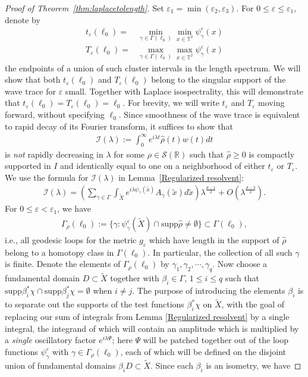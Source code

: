 \documentclass[11pt,letterpaper,oneside]{amsart}
\newcommand{\R}{\mathbb{R}}
\newcommand{\T}{\mathbb{T}}
\newcommand{\supp}{\text{supp}}
\theoremstyle{definition}
\theoremstyle{remark}
\newcommand{\eps}{\varepsilon}
\newcommand{\wt}{\widetilde}
\newcommand{\wh}{\widehat}
\newcommand{\I}{\mathcal{I}}
\theoremstyle{definition}
\theoremstyle{remark}
\begin{document}
\begin{proof}[Proof of Theorem~\ref{thm:laplacetolength}]
    {Set $\eps_1 = \min(\eps_2,\eps_3)$. For $0 \leq \eps \leq \eps_1$, denote by
    \begin{align*}
        t_\eps(\ell_0) = & \min_{\gamma \in \Gamma(\ell_0)} \min_{x \in \T^2} \psi_\gamma^\eps (x)
        \\
        T_\eps(\ell_0) = & \max_{\gamma \in \Gamma(\ell_0)} \max_{x \in \T^2} \psi_\gamma^\eps(x)
    \end{align*}
    the endpoints of a union of such cluster intervals in the length spectrum. We will show that both $t_\eps(\ell_0)$ and $T_\eps(\ell_0)$ belong to the singular support of the wave trace for $\eps$ small. Together with Laplace isospectrality, this will demonstrate that $t_\eps(\ell_0) = T_\eps(\ell_0) = \ell_0$. For brevity, we will write $t_\eps$ and $T_\eps$ moving forward, without specifying $\ell_0$.} Since smoothness of the wave trace is equivalent to rapid decay of its Fourier transform, it suffices to show that
    \begin{align*}
        \I(\lambda) := \int_0^\infty e^{i \lambda t} \wh \rho(t) w(t) dt
    \end{align*}
    is \textit{not} rapidly decreasing in $\lambda$ for some $\rho \in \mathscr{S}(\R)$ such that $\wh \rho \geq 0$ is compactly supported in $I$ and identically equal to one on a neighborhood of either $t_\eps$ or $T_\eps$. We use the formula for $\I(\lambda)$ in Lemma~\ref{Regularized resolvent}:
    \begin{align*}
        \I(\lambda) = \left(\sum_{\gamma \in \Gamma} \int_{\wt X} e^{i \lambda \psi_{\gamma}(\wt x)} A_\gamma(\wt x) d \wt x \right) \lambda^{\frac{d-1}{2}}  + O(\lambda^{\frac{d-3}{2}}).
    \end{align*}
    For $0 \leq \eps < \eps_1$, we have
    \begin{align}
        \Gamma_\rho(\ell_0):= \{\gamma: \psi_\gamma^{\eps}(\wt X) \cap \supp \wh \rho \neq \emptyset \} \subset \Gamma(\ell_0),
    \end{align}
    i.e., all geodesic loops for the metric $g_\eps$ which have length in the support of $\wh \rho$ belong to a homotopy class in $\Gamma(\ell_0)$. In particular, the collection of all such $\gamma$ is finite. Denote the elements of $\Gamma_\rho(\ell_0)$ by $\gamma_1, \gamma_2, \cdots, \gamma_q$. Now choose a fundamental domain $D \subset \wt X$ together with $\beta_i \in \Gamma$, $1 \leq i \leq q$ such that $\supp \beta_i^*\chi \cap \supp \beta_j^* \chi = \emptyset$ when $i \neq j$. The purpose of introducing the elements $\beta_i$ is to separate out the supports of the test functions $\beta_i^* \chi$ on $\wt X$, with the goal of replacing our sum of integrals from Lemma \ref{Regularized resolvent} by a single integral, the integrand of which will contain an amplitude which is multiplied by a \textit{single} oscillatory factor $e^{i \lambda \Psi}$; here $\Psi$ will be patched together out of the loop functions $\psi_\gamma^\eps$ with $\gamma \in \Gamma_\rho(\ell_0)$, each of which will be defined on the disjoint union of fundamental domains $\beta_i D \subset \wt X$. Since each $\beta_i$ is an isometry, we have

\end{proof}
\end{document}
